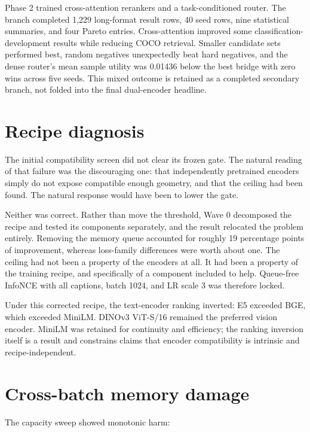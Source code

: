 Phase 2 trained cross-attention rerankers and a task-conditioned router. The branch completed 1,229 long-format result rows, 40 seed rows, nine statistical summaries, and four Pareto entries. Cross-attention improved some classification-development results while reducing COCO retrieval. Smaller candidate sets performed best, random negatives unexpectedly beat hard negatives, and the dense router's mean sample utility was 0.01436 below the best bridge with zero wins across five seeds. This mixed outcome is retained as a completed secondary branch, not folded into the final dual-encoder headline.

\section{Recipe diagnosis}
The initial compatibility screen did not clear its frozen gate. The natural reading of that failure was the discouraging one: that independently pretrained encoders simply do not expose compatible enough geometry, and that the ceiling had been found. The natural response would have been to lower the gate.

Neither was correct. Rather than move the threshold, Wave 0 decomposed the recipe and tested its components separately, and the result relocated the problem entirely. Removing the memory queue accounted for roughly 19 percentage points of improvement, whereas loss-family differences were worth about one. The ceiling had not been a property of the encoders at all. It had been a property of the training recipe, and specifically of a component included to help. Queue-free InfoNCE with all captions, batch 1024, and LR scale 3 was therefore locked.

Under this corrected recipe, the text-encoder ranking inverted: E5 exceeded BGE, which exceeded MiniLM. DINOv3 ViT-S/16 remained the preferred vision encoder. MiniLM was retained for continuity and efficiency; the ranking inversion itself is a result and constrains claims that encoder compatibility is intrinsic and recipe-independent.

\section{Cross-batch memory damage}
The capacity sweep showed monotonic harm:


